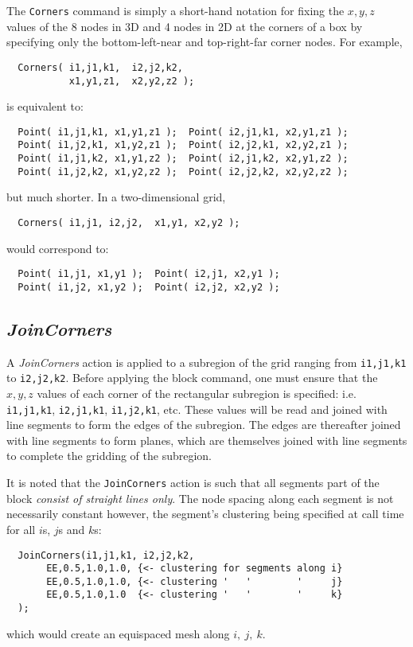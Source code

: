\documentclass{warpdoc}
\begin{document}
The \verb|Corners| command is simply a short-hand notation
for fixing the $x,y,z$ values of the 8 nodes in 3D and 4 nodes
in 2D at the corners of a box
by specifying only the bottom-left-near and top-right-far corner nodes.
For example,
%
\begin{verbatim}
  Corners( i1,j1,k1,  i2,j2,k2,  
           x1,y1,z1,  x2,y2,z2 );
\end{verbatim}
%
is equivalent to:
%
\begin{verbatim}
  Point( i1,j1,k1, x1,y1,z1 );  Point( i2,j1,k1, x2,y1,z1 );
  Point( i1,j2,k1, x1,y2,z1 );  Point( i2,j2,k1, x2,y2,z1 );
  Point( i1,j1,k2, x1,y1,z2 );  Point( i2,j1,k2, x2,y1,z2 );
  Point( i1,j2,k2, x1,y2,z2 );  Point( i2,j2,k2, x2,y2,z2 );
\end{verbatim}
%
but much shorter. In a two-dimensional grid,
%
\begin{verbatim}
  Corners( i1,j1, i2,j2,  x1,y1, x2,y2 );
\end{verbatim}
%
would correspond to:
%
\begin{verbatim}
  Point( i1,j1, x1,y1 );  Point( i2,j1, x2,y1 );
  Point( i1,j2, x1,y2 );  Point( i2,j2, x2,y2 );
\end{verbatim}
%

\subsection{\emph{JoinCorners}}

A \emph{JoinCorners} action is applied to a
subregion of the grid 
ranging from \verb|i1,j1,k1| to \verb|i2,j2,k2|. Before applying
the block command, one must ensure that the $x,y,z$ values of each corner
of the rectangular subregion is specified: i.e. \verb|i1,j1,k1|,
\verb|i2,j1,k1|, \verb|i1,j2,k1|, etc. These values will
be read and joined with line segments to form the edges of
the subregion. The edges are thereafter joined with line segments 
to form planes, which are themselves joined with line segments to complete
the gridding of the subregion.

It is noted that the \verb|JoinCorners|
action is such that all segments part of the block \emph{consist
of straight lines only}. The node spacing along each segment
is not necessarily constant however, the segment's clustering
being specified at call time for all $i$s, $j$s and $k$s:
%
\begin{verbatim}
  JoinCorners(i1,j1,k1, i2,j2,k2,
       EE,0.5,1.0,1.0, {<- clustering for segments along i}
       EE,0.5,1.0,1.0, {<- clustering '   '        '     j}
       EE,0.5,1.0,1.0  {<- clustering '   '        '     k}
  );
\end{verbatim}
%
which would create an equispaced mesh along $i,~j,~k$. 
\end{document}
